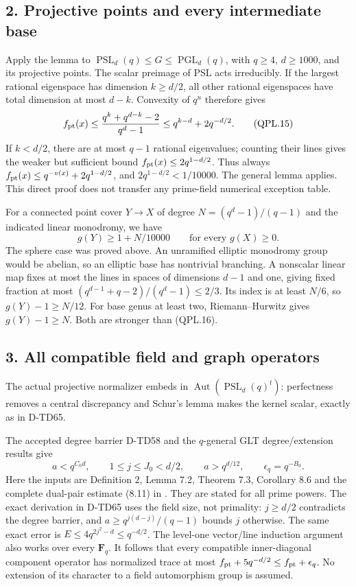 \subsection*{2. Projective points and every intermediate base}

Apply the lemma to
\(\operatorname{PSL}_d(q)\le G\le\operatorname{PGL}_d(q)\),
with \(q\ge4\), \(d\ge1000\), and its projective points.
The scalar preimage of PSL acts irreducibly.
If the largest rational eigenspace has dimension \(k\ge d/2\),
all other rational eigenspaces have total dimension at most
\(d-k\). Convexity of \(q^u\) therefore gives
\[
 f_{\rm pt}(x)\le
      \frac{q^k+q^{d-k}-2}{q^d-1}
      \le q^{k-d}+2q^{-d/2}.
 \tag{QPL.15}
\]
If \(k<d/2\), there are at most \(q-1\) rational eigenvalues;
counting their lines gives the weaker but sufficient bound
\(f_{\rm pt}(x)\le2q^{1-d/2}\).
Thus always \(f_{\rm pt}(x)\le q^{-v(x)}+2q^{1-d/2}\),
and \(2q^{1-d/2}<1/10000\).
The general lemma applies. This direct proof does not transfer
any prime-field numerical exception table.

For a connected point cover \(Y\to X\) of degree
\(N=(q^d-1)/(q-1)\) and the indicated linear monodromy, we have
\[
                            g(Y)\ge1+N/10000
                           \qquad\text{for every }g(X)\ge0.
 \tag{QPL.16}
\]
The sphere case was proved above. An unramified elliptic
monodromy group would be abelian, so an elliptic base has
nontrivial branching. A nonscalar linear map fixes at most
the lines in spaces of dimensions \(d-1\) and one, giving
fixed fraction at most
\((q^{d-1}+q-2)/(q^d-1)\le2/3\).
Its index is at least \(N/6\), so \(g(Y)-1\ge N/12\).
For base genus at least two, Riemann--Hurwitz gives
\(g(Y)-1\ge N\). Both are stronger than (QPL.16).

\subsection*{3. All compatible field and graph operators}

The actual projective normalizer embeds in
\(\operatorname{Aut}(\operatorname{PSL}_d(q)^t)\):
perfectness removes a central discrepancy and Schur's lemma
makes the kernel scalar, exactly as in D-TD65.

The accepted degree barrier D-TD58 and the \(q\)-general
GLT degree/extension results give
\[
 a<q^{C_0d},\qquad 1\le j\le J_0<d/2,\qquad
 a>q^{d/12},\qquad \epsilon_q=q^{-B_0}.
 \tag{QPL.17}
\]
Here the inputs are Definition 2, Lemma 7.2, Theorem 7.3,
Corollary 8.6 and the complete dual-pair estimate (8.11) in
\cite{UNW:GLT2020}. They are stated for all prime powers.
The exact derivation in D-TD65 uses the field size, not
primality: \(j\ge d/2\) contradicts the degree barrier,
and \(a\ge q^{j(d-j)}/(q-1)\) bounds \(j\) otherwise.
The same exact error is
\(E\le4q^{2j^2-d}\le q^{-d/2}\).
The level-one vector/line induction argument also works
over every \(\mathbf F_q\). It follows that every compatible
inner-diagonal component operator has normalized trace
at most \(f_{\rm pt}+5q^{-d/2}\le f_{\rm pt}+\epsilon_q\).
No extension of its character to a field automorphism group
is assumed.

